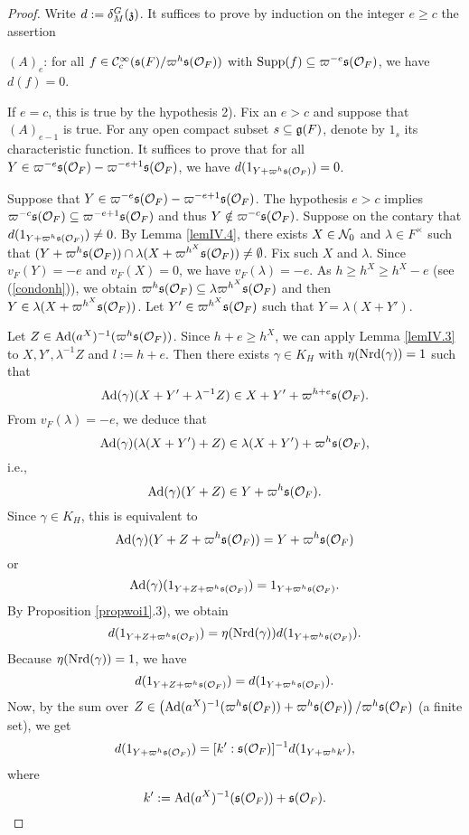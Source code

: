 \documentclass[a4paper]{amsart}
\theoremstyle{definition}
\theoremstyle{remark}
\numberwithin{equation}{subsection}
\begin{document}
\begin{proof}
Write $d:=\delta_M^G({\mathfrak{z}})$. It suffices to prove by induction on the integer $e\geq c$ the assertion 

$(A)_e$: for all $f\in{\mathcal {C}}_c^\infty({\mathfrak{s}}(F)/\varpi^h{\mathfrak{s}}({\mathcal {O}}_F))$ with ${\mathrm{Supp}}(f)\subseteq\varpi^{-e}{\mathfrak{s}}({\mathcal {O}}_F)$, we have $d(f)=0$. 

If $e=c$, this is true by the hypothesis 2). Fix an $e>c$ and suppose that $(A)_{e-1}$ is true. For any open compact subset $s\subseteq{\mathfrak{g}}(F)$, denote by $1_s$ its characteristic function. It suffices to prove that for all $Y\in\varpi^{-e}{\mathfrak{s}}({\mathcal {O}}_F)-\varpi^{-e+1}{\mathfrak{s}}({\mathcal {O}}_F)$, we have $d(1_{Y+\varpi^h{\mathfrak{s}}({\mathcal {O}}_F)})=0$. 

Suppose that $Y\in\varpi^{-e}{\mathfrak{s}}({\mathcal {O}}_F)-\varpi^{-e+1}{\mathfrak{s}}({\mathcal {O}}_F)$. The hypothesis $e>c$ implies $\varpi^{-c}{\mathfrak{s}}({\mathcal {O}}_F)\subseteq\varpi^{-e+1}{\mathfrak{s}}({\mathcal {O}}_F)$ and thus $Y\notin\varpi^{-c}{\mathfrak{s}}({\mathcal {O}}_F)$. Suppose on the contary that $d(1_{Y+\varpi^h{\mathfrak{s}}({\mathcal {O}}_F)})\neq0$. By Lemma \ref{lemIV.4}, there exists $X\in{\mathcal {N}}_0$ and $\lambda\in F^\times$ such that $(Y+\varpi^h{\mathfrak{s}}({\mathcal {O}}_F))\cap\lambda(X+\varpi^{h^X}{\mathfrak{s}}({\mathcal {O}}_F))\neq\emptyset$. Fix such $X$ and $\lambda$. Since $v_F(Y)=-e$ and $v_F(X)=0$, we have $v_F(\lambda)=-e$. As $h\geq h^X\geq h^X-e$ (see (\ref{condonh})), we obtain $\varpi^h{\mathfrak{s}}({\mathcal {O}}_F)\subseteq\lambda\varpi^{h^X}{\mathfrak{s}}({\mathcal {O}}_F)$ and then $Y\in\lambda(X+\varpi^{h^X}{\mathfrak{s}}({\mathcal {O}}_F))$. Let $Y'\in\varpi^{h^X}{\mathfrak{s}}({\mathcal {O}}_F)$ such that $Y=\lambda(X+Y')$. 

Let $Z\in{\mathrm{Ad}}(a^X)^{-1}(\varpi^h{\mathfrak{s}}({\mathcal {O}}_F))$. Since $h+e\geq h^X$, we can apply Lemma \ref{lemIV.3} to $X, Y',\lambda^{-1}Z$ and $l:=h+e$. Then there exists $\gamma\in K_H$ with $\eta({\mathrm{Nrd}}(\gamma))=1$ such that
$$ {\mathrm{Ad}}(\gamma)(X+Y'+\lambda^{-1}Z)\in X+Y'+\varpi^{h+e}{\mathfrak{s}}({\mathcal {O}}_F). $$
From $v_F(\lambda)=-e$, we deduce that
$$ {\mathrm{Ad}}(\gamma)(\lambda(X+Y')+Z)\in\lambda(X+Y')+\varpi^h{\mathfrak{s}}({\mathcal {O}}_F), $$
i.e., 
$$ {\mathrm{Ad}}(\gamma)(Y+Z)\in Y+\varpi^h{\mathfrak{s}}({\mathcal {O}}_F). $$
Since $\gamma\in K_H$, this is equivalent to
$$ {\mathrm{Ad}}(\gamma)(Y+Z+\varpi^h{\mathfrak{s}}({\mathcal {O}}_F))=Y+\varpi^h{\mathfrak{s}}({\mathcal {O}}_F) $$
or
$$ {\mathrm{Ad}}(\gamma)(1_{Y+Z+\varpi^h{\mathfrak{s}}({\mathcal {O}}_F)})=1_{Y+\varpi^h{\mathfrak{s}}({\mathcal {O}}_F)}. $$
By Proposition \ref{propwoi1}.3), we obtain
$$ d(1_{Y+Z+\varpi^h{\mathfrak{s}}({\mathcal {O}}_F)})=\eta({\mathrm{Nrd}}(\gamma))d(1_{Y+\varpi^h{\mathfrak{s}}({\mathcal {O}}_F)}). $$
Because $\eta({\mathrm{Nrd}}(\gamma))=1$, we have
$$ d(1_{Y+Z+\varpi^h{\mathfrak{s}}({\mathcal {O}}_F)})=d(1_{Y+\varpi^h{\mathfrak{s}}({\mathcal {O}}_F)}). $$
Now, by the sum over $Z\in\left({\mathrm{Ad}}(a^X)^{-1}(\varpi^h{\mathfrak{s}}({\mathcal {O}}_F))+\varpi^h{\mathfrak{s}}({\mathcal {O}}_F)\right)/\varpi^h{\mathfrak{s}}({\mathcal {O}}_F)$ (a finite set), we get
\begin{equation}\label{equIV.5(3)}
 d(1_{Y+\varpi^h{\mathfrak{s}}({\mathcal {O}}_F)})=[k':{\mathfrak{s}}({\mathcal {O}}_F)]^{-1}d(1_{Y+\varpi^h k'}), 
\end{equation}
where
\begin{equation}\label{equk'}
 k':={\mathrm{Ad}}(a^X)^{-1}({\mathfrak{s}}({\mathcal {O}}_F))+{\mathfrak{s}}({\mathcal {O}}_F). 
\end{equation}


\end{proof}
\end{document}
